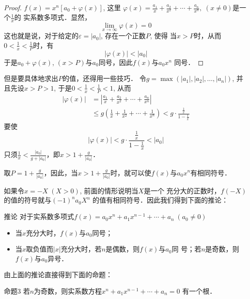 \begin{proof}
$f(x)=x^n[a_0+\varphi(x)]$, 这里
$\varphi(x)=\frac{a_1}{x}+\frac{a_2}{x^2}+\cdots+\frac{a_n}{x^n},\; (x\ne 0)$是一个$\frac{1}{x}$的
实系数多项式．显然，
\[\lim_{x\to\infty} \varphi(x)=0\]
这也就是说，对于给定的$\varepsilon=|a_0|$, 存在一个正数$P$, 使得
当$x>P$时，从而$0<\frac{1}{x}<\frac{1}{P}$时，有
\[|\varphi(x)|<|a_0|\]
于是$a_0+\varphi(x)$, $(x>P)$与$a_0$同号，因此$f(x)$与$a_0x^n$
同号．
\end{proof}

但是要具体地求出$P$的值，还得用一些技巧．
令$g=\max(|a_1|,|a_2|,\ldots,|a_n|)$, 并且先设$x>P>
1$, 于是$0<\frac{1}{x}<\frac{1}{P}<1$, 从而
\[\begin{split}
    |\varphi(x)|&=\left|\frac{a_1}{x}+\frac{a_2}{x^2}+\cdots+\frac{a_n}{x^n}\right|\\
    &\le g\left(\frac{1}{x}+\frac{1}{x^2}+\cdots+\frac{1}{x^n}\right)< g\cdot \frac{\frac{1}{x}}{1-\frac{1}{x}}
\end{split}\]
要使
\[|\varphi(x)|<g\cdot \frac{\frac{1}{x}}{1-\frac{1}{x}}<|a_0|\]
只须$\frac{1}{x}<\frac{|a_0|}{g+|a_0|}$，即$x>1+\frac{g}{|a_0|}$．

取$P=1+\frac{g}{|a_0|}$，因此，当$x>1+\frac{g}{|a_0|}$时，就可以使$f(x)$与$a_0x^n$有相同符号．

如果令$x=-X\; (X>0)$, 前面的情形说明当$X$是一个
充分大的正数时，$f(-X)$的值的符号就与$(-1)^na_0X^n$
的值有相同符号．因此我们得到下面的推论：

\begin{blk}{推论}
    对于实系数多项式$f(x)=a_0x^n+a_1x^{n-1}+\cdots+a_n\; (a_0\ne 0)$
\begin{itemize}
    \item 当$x$充分大时，$f(x)$与$a_0$同号；
    \item 当$x$取负值而$|x|$充分大时，若$n$是偶数，则$f(x)$与$a_0$同
号；若$n$是奇数，则$f(x)$与$a_0$异号．
\end{itemize}
\end{blk}

由上面的推论直接得到下面的命题：
\begin{blk}{命题3}
    若$n$为奇数，则实系数方程$x^n+a_1x^{n-1}+\cdots+a_n=0$
有一个根． 
\end{blk}

